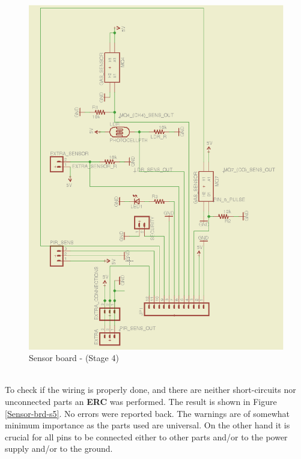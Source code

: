 \documentclass[12pt,a4paper]{report}
\begin{document}
\begin{figure}[H]
\centering
\includegraphics*[scale=0.25]{sens_brd_s4}
\caption{Sensor board -  (Stage 4)}
\label{Sensor-brd-s4} 
\end{figure}
\ \\
To check if the wiring is properly done, and there are neither short-circuits nor unconnected parts an \textbf{ERC} was performed.
The result is shown in Figure \ref{Sensor-brd-s5}.
No errors were reported back.
The warnings are of somewhat minimum importance as the parts used are universal.
On the other hand it is crucial for all pins to be connected either to other parts and/or to the power supply and/or to the ground.
\ \\
\end{document}
